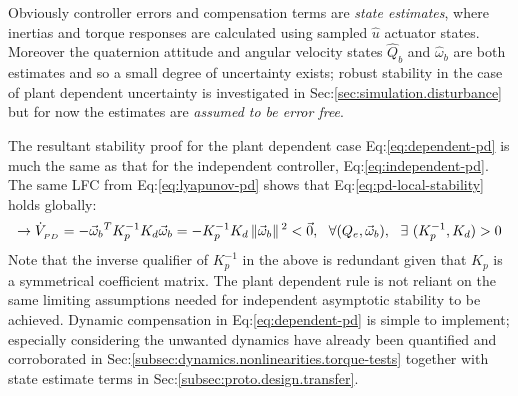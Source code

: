 {\begin{equation}
\end{equation}
Obviously controller errors and compensation terms are \emph{state estimates}, where inertias and torque responses are calculated using sampled $\hat{u}$ actuator states. Moreover the quaternion attitude and angular velocity states $\hat{Q}_b$ and $\hat{\omega}_b$ are both estimates and so a small degree of uncertainty exists; robust stability in the case of plant dependent uncertainty is investigated in Sec:\ref{sec:simulation.disturbance} but for now the estimates are \emph{assumed to be error free}.
\par
The resultant stability proof for the plant dependent case Eq:\ref{eq:dependent-pd} is much the same as that for the independent controller, Eq:\ref{eq:independent-pd}. The same LFC from Eq:\ref{eq:lyapunov-pd} shows that Eq:\ref{eq:pd-local-stability} holds globally:
\begin{equation}\label{eq:dependent-global-stability}
\rightarrow\dot{V}_{_{PD}}=-\vec{\omega}_b\text{}^TK_p^{-1}K_d\vec{\omega}_b=-K_p^{-1}K_d\left\lVert\vec{\omega}_b\right\rVert\text{}^2<\vec{0},~~\forall(Q_e,\vec{\omega}_b),~~\exists~(K_p^{-1},K_d)>0
\end{equation}
Note that the inverse qualifier of $K_p^{-1}$ in the above is redundant given that $K_p$ is a symmetrical coefficient matrix. The plant dependent rule is not reliant on the same limiting assumptions needed for independent asymptotic stability to be achieved. Dynamic compensation in Eq:\ref{eq:dependent-pd} is simple to implement; especially considering the unwanted dynamics have already been quantified and corroborated in Sec:\ref{subsec:dynamics.nonlinearities.torque-tests} together with state estimate terms in Sec:\ref{subsec:proto.design.transfer}.
}
